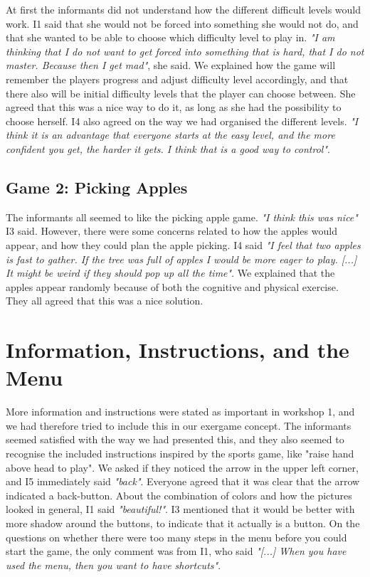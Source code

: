 At first the informants did not understand how the different difficult levels would work. I1 said that she would not be forced into something she would not do, and that she wanted to be able to choose which difficulty level to play in. \emph{"I am thinking that I do not want to get forced into something that is hard, that I do not master. Because then I get mad"}, she said. We explained how the game will remember the players progress and adjust difficulty level accordingly, and that there also will be initial difficulty levels that the player can choose between. She agreed that this was a nice way to do it, as long as she had the possibility to choose herself. I4 also agreed on the way we had organised the different levels. \emph{"I think it is an advantage that everyone starts at the easy level, and the more confident you get, the harder it gets. I think that is a good way to control"}.

\subsection{Game 2: Picking Apples}

The informants all seemed to like the picking apple game. \emph{"I think this was nice"} I3 said. However, there were some concerns related to how the apples would appear, and how they could plan the apple picking. I4 said \emph{"I feel that two apples is fast to gather. If the tree was full of apples I would be more eager to play. [...] It might be weird if they should pop up all the time"}. We explained that the apples appear randomly because of both the cognitive and physical exercise. They all agreed that this was a nice solution. 


\section{Information, Instructions, and the Menu}

More information and instructions were stated as important in workshop 1, and we had therefore tried to include this in our exergame concept. The informants seemed satisfied with the way we had presented this, and they also seemed to recognise the included instructions inspired by the sports game, like "raise hand above head to play". We asked if they noticed the arrow in the upper left corner, and I5 immediately said \emph{"back"}. Everyone agreed that it was clear that the arrow indicated a back-button. About the combination of colors and how the pictures looked in general, I1 said \emph{"beautiful!"}. I3 mentioned that it would be better with more shadow around the buttons, to indicate that it actually is a button. On the questions on whether there were too many steps in the menu before you could start the game, the only comment was from I1, who said \emph{"[...] When you have used the menu, then you want to have shortcuts"}. 

